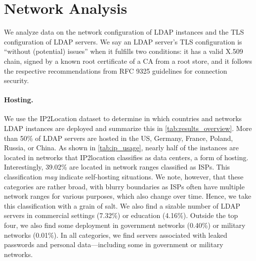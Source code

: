 \section{Network Analysis}
\label{sec:network_analysis}

We analyze data on the network configuration of \acrshort{LDAP} instances and the \gls{TLS} configuration of \gls{LDAP} servers. We say an LDAP server's \gls{TLS} configuration is \enquote{without (potential) issues} when it fulfills two conditions: it has a valid X.509 chain, signed by a known root certificate of a \gls{CA} from a root store, and it follows the respective recommendations from RFC 9325 \cite{rfc9325} guidelines for connection security.

\paragraph{Hosting.}

We use the IP2Location dataset to determine in which countries and networks \acrshort{LDAP} instances are deployed and summarize this in \cref{tab:results_overview}. More than 50\% of \acrshort{LDAP} servers are hosted in the US, Germany, France, Poland, Russia, or China. As shown in \cref{tab:ip_usage}, nearly half of the instances are located in networks that IP2location classifies as data centers, \ie a form of hosting. 
Interestingly, 39.02\% are located in network ranges classified as \glspl{ISP}. This classification \textit{may} indicate self-hosting situations. We note, however, that these categories are rather broad, with blurry boundaries as \glspl{ISP} often have multiple network ranges for various purposes, which also change over time. 
Hence, we take this classification with a grain of salt. We also find a sizable number of \acrshort{LDAP} servers in commercial settings (7.32\%) or education (4.16\%). Outside the top four, we also find some deployment in government networks (0.40\%) or military networks (0.01\%). In all categories, we find servers associated with leaked passwords and personal data---including some in government or military networks.%

